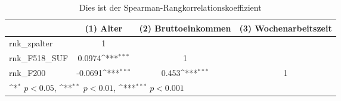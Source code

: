 \begin{table}[htbp]\centering
\def\sym#1{\ifmmode^{#1}\else\(^{#1}\)\fi}
\caption{Dies ist der Spearman-Rangkorrelationskoeffizient}
\begin{tabular}{l*{3}{c}}
\toprule
                              &(1) Alter         &(2) Bruttoeinkommen         &(3) Wochenarbeitszeit         \\
\midrule
rnk\_zpalter                   &        1         &                  &                  \\
rnk\_F518\_SUF                  &   0.0974\sym{***}&        1         &                  \\
rnk\_F200                      &  -0.0691\sym{***}&    0.453\sym{***}&        1         \\
\bottomrule
\multicolumn{4}{l}{\footnotesize \sym{*} \(p<0.05\), \sym{**} \(p<0.01\), \sym{***} \(p<0.001\)}\\
\end{tabular}
\end{table}
